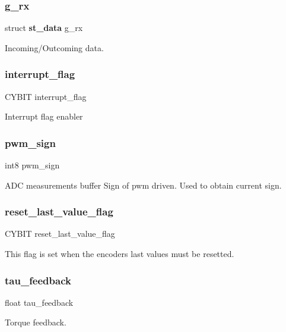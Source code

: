 \subsubsection{g\+\_\+rx}
{\footnotesize\ttfamily struct \textbf{ st\+\_\+data} g\+\_\+rx}

Incoming/\+Outcoming data. \mbox{\label{globals_8c_a1e6fda88dfdabc63859f8907eb702920}} 
\subsubsection{interrupt\+\_\+flag}
{\footnotesize\ttfamily C\+Y\+B\+IT interrupt\+\_\+flag}

Interrupt flag enabler \mbox{\label{globals_8c_a8ac7ad7c894db750e93bc745818e26ca}} 
\subsubsection{pwm\+\_\+sign}
{\footnotesize\ttfamily int8 pwm\+\_\+sign}

A\+DC measurements buffer Sign of pwm driven. Used to obtain current sign. \mbox{\label{globals_8c_aa89a782cfe75ce7970236babd308fe69}} 
\subsubsection{reset\+\_\+last\+\_\+value\+\_\+flag}
{\footnotesize\ttfamily C\+Y\+B\+IT reset\+\_\+last\+\_\+value\+\_\+flag}

This flag is set when the encoders last values must be resetted. \mbox{\label{globals_8c_a894b799ffe45f442a6a897580ab7e98e}} 
\subsubsection{tau\+\_\+feedback}
{\footnotesize\ttfamily float tau\+\_\+feedback}

Torque feedback. \mbox{\label{globals_8c_ac42fa606610c2600210d9b7b2c1d0882}} 
